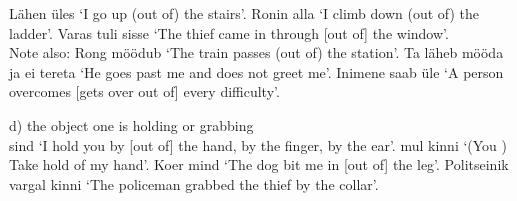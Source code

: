 Lähen  üles `I go up (out of) the stairs'. Ronin  alla `I climb down (out of) the ladder'. Varas tuli  sisse `The thief came in through [out of] the window'. \\

Note also: Rong möödub  `The train passes (out of) the station'. Ta läheb  mööda ja ei tereta `He goes past me and does not greet me'. Inimene saab üle  `A person overcomes [gets over out of] every difficulty'.

\newSection  d) the object one is holding or grabbing \\

 sind  `I hold you by [out of] the hand, by the finger, by the ear'.  mul  kinni `(You \sing) Take hold of my hand'. Koer  mind  `The dog bit me in [out of] the leg'. Politseinik  vargal  kinni `The policeman grabbed the thief by the collar'.

\Text %

\Vocabulary %

\Exercises %

\Expressions %

\AnswersToExercises %